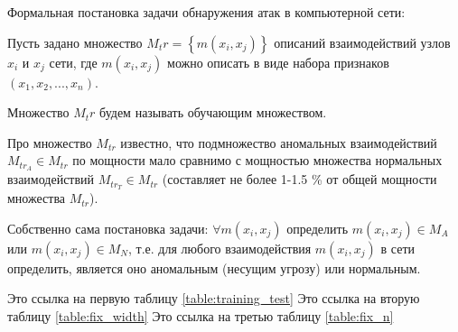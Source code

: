 \documentclass[12pt,a4paper]{article}
\begin{document}
Формальная постановка задачи обнаружения атак в компьютерной сети:

Пусть задано множество $M_tr = \left\{m(x_i, x_j)\right\}$ описаний взаимодействий узлов $x_i$ и $x_j$ сети, где $m(x_i, x_j)$ можно описать в виде набора признаков $(x_1, x_2, ..., x_n)$.


Множество $M_tr$ будем называть обучающим множеством.

Про множество $M_{tr}$ известно, что подмножество аномальных взаимодействий 
$M_{tr_A} \in M_{tr}$ по мощности мало сравнимо с мощностью множества 
нормальных взаимодействий $M_{tr_T} \in M_{tr}$ 
(составляет не более 1-1.5 \% от общей мощности множества $M_{tr}$). 


Собственно сама постановка задачи:
$\forall m(x_i, x_j)$ определить $m(x_i, x_j) \in M_A$ 
или $m(x_i, x_j) \in M_N$, т.е. для любого 
взаимодействия $m(x_i, x_j)$ в сети определить, 
является оно аномальным (несущим угрозу) или нормальным.

Это ссылка на первую таблицу \ref{table:training_test}
Это ссылка на вторую таблицу \ref{table:fix_width}
Это ссылка на третью таблицу \ref{table:fix_n}
\end{document}
